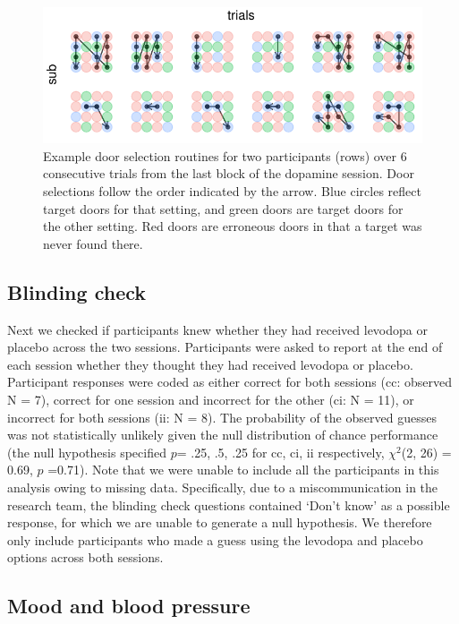 \documentclass[
  man]{apa6}
\begin{document}
\begin{figure}

{\centering \includegraphics[width=0.7\linewidth]{../../images/trajectories2subs} 

}

\caption{Example door selection routines for two participants (rows) over 6 consecutive trials from the last block of the dopamine session. Door selections follow the order indicated by the arrow. Blue circles reflect target doors for that setting, and green doors are target doors for the other setting. Red doors are erroneous doors in that a target was never found there.}\label{fig:trajecfig}
\end{figure}

\hypertarget{blinding-check}{%
\subsection{Blinding check}\label{blinding-check}}

\label{sec:Blinding Results}

Next we checked if participants knew whether they had received levodopa or placebo across the two sessions. Participants were asked to report at the end of each session whether they thought they had received levodopa or placebo. Participant responses were coded as either correct for both sessions (cc: observed N = 7), correct for one session and incorrect for the other (ci: N = 11), or incorrect for both sessions (ii: N = 8). The probability of the observed guesses was not statistically unlikely given the null distribution of chance performance (the null hypothesis specified \(p\)= .25, .5, .25 for cc, ci, ii respectively, \(\chi^2\)(2, 26) = 0.69, \(p\) =0.71). Note that we were unable to include all the participants in this analysis owing to missing data. Specifically, due to a miscommunication in the research team, the blinding check questions contained `Don't know' as a possible response, for which we are unable to generate a null hypothesis. We therefore only include participants who made a guess using the levodopa and placebo options across both sessions.

\hypertarget{mood-and-blood-pressure}{%
\subsection{Mood and blood pressure}\label{mood-and-blood-pressure}}
\end{document}
